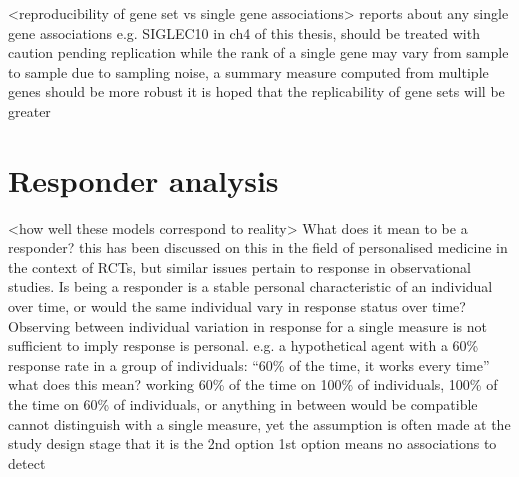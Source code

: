 \begin{outline}
\1 <reproducibility of gene set vs single gene associations> 
    \2 reports about any single gene associations e.g. SIGLEC10 in ch4 of this thesis, should be treated with caution pending replication
    \2 while the rank of a single gene may vary from sample to sample due to sampling noise, a summary measure computed from multiple genes should be more robust
    \2 it is hoped that the replicability of gene sets will be greater


\section{Responder analysis}

\1 <how well these models correspond to reality>
    \2 What does it mean to be a responder?
    \2 this has been discussed on this in the field of personalised medicine in the context of RCTs, but similar issues pertain to response in observational studies. \autocite{senn2018StatisticalPitfallsPersonalized}
    \2 Is being a responder is a stable personal characteristic of an individual over time, or would the same individual vary in response status over time?
    \2 Observing between individual variation in response for a single measure is not sufficient to imply response is personal.
    \2 e.g. a hypothetical agent with a 60\% response rate in a group of individuals: \enquote{60\% of the time, it works every time}
    \2 what does this mean? working 60\% of the time on 100\% of individuals, 100\% of the time on 60\% of individuals, or anything in between would be compatible
    \2 cannot distinguish with a single measure, yet the assumption is often made at the study design stage that it is the 2nd option
    \2 1st option means no associations to detect


\end{outline}
